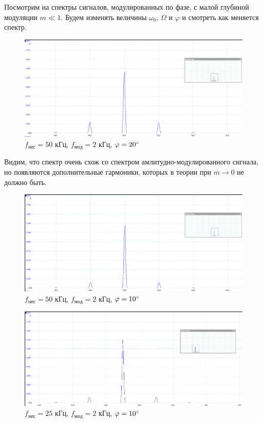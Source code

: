 \documentclass[a4paper,12pt]{article}
\begin{document}
Посмотрим на спектры сигналов, модулированных по фазе, с малой глубиной модуляции $m \ll 1$. Будем изменять величины $\omega_0$, $\Omega$ и $\varphi$ и смотреть как меняется спектр.
\begin{figure}[H]\label{fig: nu_PM_50kHz_phi_20}
    \centering
    \includegraphics[width = \textwidth]{nu_PM_50kHz_phi_20.png}
    \caption{$f_{нес} = 50$ кГц, $f_{мод} = 2$ кГц, $\varphi = 20\degree$}
\end{figure}
Видим, что спектр очень схож со спектром амлитудно-модулированного сигнала, но появляются дополнительные гармоники, которых в теории при $m \rightarrow 0$ не должно быть.

\begin{figure}[H]\label{fig: nu_PM_50kHz_phi_10}
    \centering
    \includegraphics[width = \textwidth]{nu_PM_50kHz_phi_10.png}
    \caption{$f_{нес} = 50$ кГц, $f_{мод} = 2$ кГц, $\varphi = 10\degree$}
\end{figure}
\begin{figure}[H]\label{fig: nu_PM_25kHz_phi_10}
    \centering
    \includegraphics[width = \textwidth]{nu_PM_25kHz.png}
    \caption{$f_{нес} = 25$ кГц, $f_{мод} = 2$ кГц, $\varphi = 10\degree$}
\end{figure}
\end{document}
